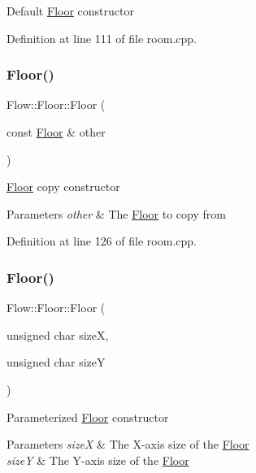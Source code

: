 Default \hyperlink{class_flow_1_1_floor}{Floor} constructor 

Definition at line 111 of file room.\+cpp.

\hypertarget{class_flow_1_1_floor_ab4003203c3ad5de4c13d669bddbb0df5}{}\label{class_flow_1_1_floor_ab4003203c3ad5de4c13d669bddbb0df5} 
\subsubsection{\texorpdfstring{Floor()}{Floor()}\hspace{0.1cm}{\footnotesize\ttfamily [2/3]}}
{\footnotesize\ttfamily Flow\+::\+Floor\+::\+Floor (\begin{DoxyParamCaption}\item[{const \hyperlink{class_flow_1_1_floor}{Floor} \&}]{other }\end{DoxyParamCaption})}

\hyperlink{class_flow_1_1_floor}{Floor} copy constructor 
\begin{DoxyParams}{Parameters}
{\em other} & The \hyperlink{class_flow_1_1_floor}{Floor} to copy from \\
\hline
\end{DoxyParams}


Definition at line 126 of file room.\+cpp.

\hypertarget{class_flow_1_1_floor_afc7d87d65bc697a8901ad9506bafb5b9}{}\label{class_flow_1_1_floor_afc7d87d65bc697a8901ad9506bafb5b9} 
\subsubsection{\texorpdfstring{Floor()}{Floor()}\hspace{0.1cm}{\footnotesize\ttfamily [3/3]}}
{\footnotesize\ttfamily Flow\+::\+Floor\+::\+Floor (\begin{DoxyParamCaption}\item[{unsigned char}]{sizeX,  }\item[{unsigned char}]{sizeY }\end{DoxyParamCaption})}

Parameterized \hyperlink{class_flow_1_1_floor}{Floor} constructor 
\begin{DoxyParams}{Parameters}
{\em sizeX} & The X-\/axis size of the \hyperlink{class_flow_1_1_floor}{Floor} \\
\hline
{\em sizeY} & The Y-\/axis size of the \hyperlink{class_flow_1_1_floor}{Floor} \\
\hline
\end{DoxyParams}


